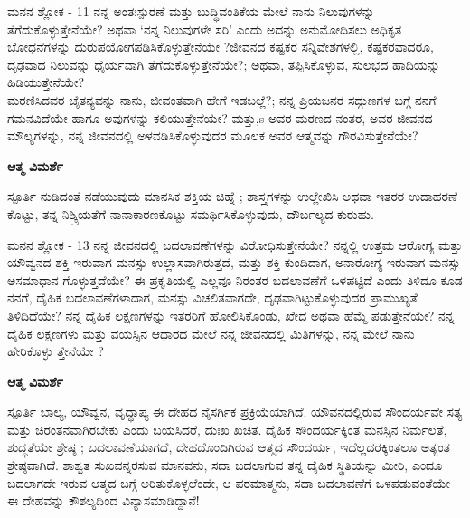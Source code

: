 \newpage
\begin{mananam}{\mananamfont ಮನನ ಶ್ಲೋಕ - \textenglish{11}}
\footnotesize \mananamtext ನನ್ನ ಅಂತಃಸ್ಪುರಣೆ ಮತ್ತು ಬುದ್ಧಿವಂತಿಕೆಯ ಮೇಲೆ ನಾನು ನಿಲುವುಗಳನ್ನು ತೆಗೆದುಕೊಳ್ಳುತ್ತೇನೆಯೇ? ಅಥವಾ ‘ನನ್ನ ನಿಲುವುಗಳೇ ಸರಿ’ ಎಂದು ಅದನ್ನು ಅನುಮೋದಿಸಲು ಅಧಿಕೃತ ಬೋಧನೆಗಳನ್ನು ದುರುಪಯೋಗಪಡಿಸಿಕೊಳ್ಳುತ್ತೇನೆಯೇ ?ಜೀವನದ ಕಷ್ಟಕರ ಸನ್ನಿವೇಶಗಳಲ್ಲಿ, ಕಷ್ಟಕರವಾದರೂ, ದೃಢವಾದ ನಿಲುವನ್ನು ಧೈರ್ಯವಾಗಿ ತೆಗೆದುಕೊಳ್ಳುತ್ತೇನೆಯೇ?; ಅಥವಾ, ತಪ್ಪಿಸಿಕೊಳ್ಳುವ, ಸುಲಭದ ಹಾದಿಯನ್ನು ಹಿಡಿಯುತ್ತೇನೆಯೇ?\\
ಮರಣಿಸಿದವರ ಚೈತನ್ಯವನ್ನು ನಾನು, ಜೀವಂತವಾಗಿ ಹೇಗೆ ಇಡಬಲ್ಲೆ?; ನನ್ನ ಪ್ರಿಯಜನರ ಸದ್ಗುಣಗಳ ಬಗ್ಗೆ ನನಗೆ ಗಮನವಿದೆಯೇ ಹಾಗೂ ಅವುಗಳನ್ನು ಕಲಿಯುತ್ತೇನೆಯೇ? ಮತ್ತು,s ಅವರ ಮರಣದ ನಂತರ, ಅವರ ಜೀವನದ ಮೌಲ್ಯಗಳನ್ನು, ನನ್ನ ಜೀವನದಲ್ಲಿ ಅಳವಡಿಸಿಕೊಳ್ಳುವುದರ ಮೂಲಕ ಅವರ ಆತ್ಮವನ್ನು ಗೌರವಿಸುತ್ತೇನೆಯೇ?
\end{mananam}
\WritingHand\enspace\textbf{ಆತ್ಮ ವಿಮರ್ಶೆ}
\begin{inspiration}{\mananamfont ಸ್ಪೂರ್ತಿ}
\footnotesize \mananamtext ನುಡಿದಂತೆ ನಡೆಯುವುದು ಮಾನಸಿಕ ಶಕ್ತಿಯ ಚಿಹ್ನೆ ; ಶಾಸ್ತ್ರಗಳನ್ನು ಉಲ್ಲೇಖಿಸಿ ಅಥವಾ ಇತರರ ಉದಾಹರಣೆ ಕೊಟ್ಟು, ತನ್ನ ನಿಶ್ಕ್ರಿಯತೆಗೆ ನಾನಾಕಾರಣಕೊಟ್ಟು ಸಮರ್ಥಿಸಿಕೊಳ್ಳುವುದು, ದೌರ್ಬಲ್ಯದ ಕುರುಹು.
\end{inspiration}
\newpage

\begin{mananam}{\mananamfont ಮನನ ಶ್ಲೋಕ - \textenglish{13}}
\footnotesize \mananamtext ನನ್ನ ಜೀವನದಲ್ಲಿ ಬದಲಾವಣೆಗಳನ್ನು ವಿರೋಧಿಸುತ್ತೇನೆಯೇ? ನನ್ನಲ್ಲಿ ಉತ್ತಮ ಆರೋಗ್ಯ ಮತ್ತು ಯೌವ್ವನದ ಶಕ್ತಿ ಇರುವಾಗ ಮನಸ್ಸು ಉಲ್ಲಾಸವಾಗಿರುತ್ತದೆ, ಮತ್ತು ಶಕ್ತಿ ಕುಂದಿದಾಗ, ಅನಾರೋಗ್ಯ ಇರುವಾಗ ಮನಸ್ಸು ಅಸಮಾಧಾನ ಗೊಳ್ಳುತ್ತದೆಯೇ? ಈ ಪ್ರಕೃತಿಯಲ್ಲಿ ಎಲ್ಲವೂ ನಿರಂತರ ಬದಲಾವಣೆಗೆ ಒಳಪಟ್ಟಿದೆ ಎಂದು ತಿಳಿದೂ ಕೂಡ ನನಗೆ, ದೈಹಿಕ ಬದಲಾವಣೆಗಳಾದಾಗ, ಮನಸ್ಸು ವಿಚಲಿತವಾಗದೇ, ದೃಢವಾಗಿಟ್ಟುಕೊಳ್ಳುವುದರ ಪ್ರಾಮುಖ್ಯತೆ ತಿಳಿದಿದೆಯೇ? ನನ್ನ ದೈಹಿಕ ಲಕ್ಷಣಗಳನ್ನು ಇತರರಿಗೆ ಹೋಲಿಸಿಕೊಂಡು, ಖೇದ ಅಥವಾ ಹೆಮ್ಮೆ ಪಡುತ್ತೇನೆಯೇ? ನನ್ನ ದೈಹಿಕ ಲಕ್ಷಣಗಳು ಮತ್ತು ವಯಸ್ಸಿನ ಆಧಾರದ ಮೇಲೆ ನನ್ನ ಜೀವನದಲ್ಲಿ ಮಿತಿಗಳನ್ನು, ನನ್ನ ಮೇಲೆ ನಾನು ಹೇರಿಕೊಳ್ಳು ತ್ತೇನೆಯೇ ?
\end{mananam}
\WritingHand\enspace\textbf{ಆತ್ಮ ವಿಮರ್ಶೆ}
\begin{inspiration}{\mananamfont ಸ್ಪೂರ್ತಿ}
\footnotesize \mananamtext ಬಾಲ್ಯ, ಯೌವ್ವನ, ವೃದ್ಧಾಪ್ಯ ಈ ದೇಹದ ನೈಸರ್ಗಿಕ ಪ್ರಕ್ರಿಯೆಯಾಗಿದೆ. ಯೌವನದಲ್ಲಿರುವ ಸೌಂದರ್ಯವೇ ಸತ್ಯ ಮತ್ತು ಚಿರಂತನವಾಗಿರಬೇಕು ಎಂದು ಬಯಸಿದರೆ, ದುಃಖ ಖಚಿತ. ದೈಹಿಕ ಸೌಂದರ್ಯಕ್ಕಿಂತ ಮನಸ್ಸಿನ ನಿರ್ಮಲತೆ, ಶುದ್ಧತೆಯೇ ಶ್ರೇಷ್ಠ ; ಬದಲಾವಣೆಯಾಗದೆ, ದೇಹದೊಂದಿಗಿರುವ ಆತ್ಮದ ಸೌಂದರ್ಯ, ಇದೆಲ್ಲದರಕ್ಕಿಂತಲೂ  ಅತ್ಯಂತ ಶ್ರೇಷ್ಠವಾಗಿದೆ.
 ಶಾಶ್ವತ ಸುಖವನ್ನರಸುವ ಮಾನವನು,  ಸದಾ ಬದಲಾಗುವ ತನ್ನ ದೈಹಿಕ ಸ್ಥಿತಿಯನ್ನು ಮೀರಿ, ಎಂದೂ ಬದಲಾಗದೇ ಇರುವ ಆತ್ಮದ ಬಗ್ಗೆ ಅರಿತುಕೊಳ್ಳಲೆಂದೇ, ಆ ಪರಮಾತ್ಮನು,  ಸದಾ ಬದಲಾವಣೆಗೆ ಒಳಪಡುವಂತೆಯೇ ಈ ದೇಹವನ್ನು ಕೌಶಲ್ಯದಿಂದ ವಿನ್ಯಾಸಮಾಡಿದ್ದಾನೆ!
\end{inspiration}
\newpage

